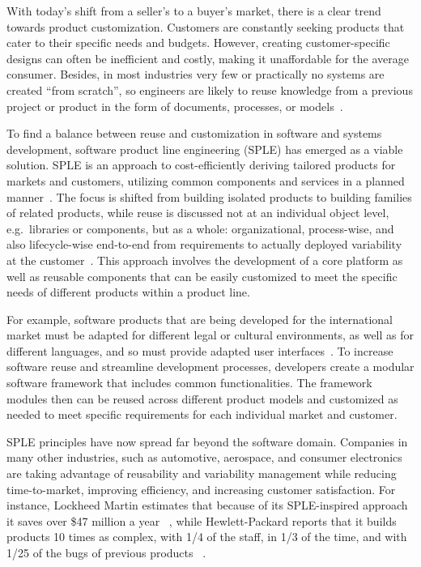 \documentclass[sigconf,review]{acmart}
\begin{document}
With today's shift from a seller's to a buyer's market, there is a clear trend towards product customization. 
Customers are constantly seeking products that cater to their specific needs and budgets. 
However, creating customer-specific designs can often be inefficient and costly, making it unaffordable for the average consumer.
Besides, in most industries very few or practically no systems are created “from scratch”, so engineers are likely to reuse knowledge from a previous project or product in the form of documents, processes, or models~\cite{Góngora_2015}. 

To find a balance between reuse and customization in software and systems development, software product line engineering (SPLE) has emerged as a viable solution. 
SPLE is an approach to cost-efficiently deriving tailored products for markets and customers, utilizing common components and services in a planned manner~\cite{Runeson_2012}.
The focus is shifted from building isolated products to building families of related products, while reuse is discussed not at an individual object level, e.g.~libraries or components, but as a whole: organizational, process-wise, and also lifecycle-wise end-to-end from requirements to actually deployed variability at the customer~\cite{Schwanninger_2009}. 
This approach involves the development of a core platform as well as reusable components that can be easily customized to meet the specific needs of different products within a product line. 

For example, software products that are being developed for the international market must be adapted for different legal or cultural environments, as well as for different languages, and so must provide adapted user interfaces~\cite{Beuche_2007}. 
To increase software reuse and streamline development processes, developers create a modular software framework that includes common functionalities. 
The framework modules then can be reused across different product models and customized as needed to meet specific requirements for each individual market and customer.

SPLE principles have now spread far beyond the software domain. Companies in many other industries, such as automotive, aerospace, and consumer electronics are taking advantage of reusability and variability management while reducing time-to-market, improving efficiency, and increasing customer satisfaction. 
For instance, Lockheed Martin estimates that because of its SPLE-inspired approach it saves over \$47 million a year ~\cite{Gregg_2015}, while Hewlett-Packard reports that it builds products 10 times as complex, with 1/4 of the staff, in 1/3 of the time, and with 1/25 of the bugs of previous products ~\cite{Mebane_2007}.
\end{document}
